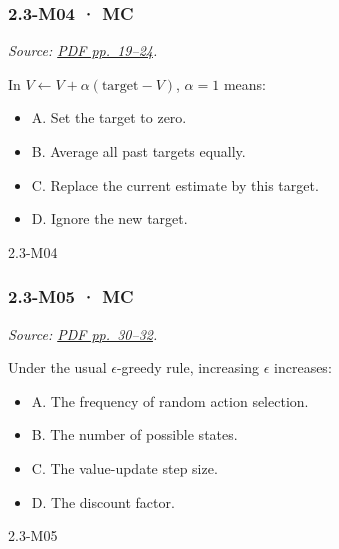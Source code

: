 \noindent\begin{minipage}{\linewidth}

\subsubsection{2.3-M04 · MC}\label{m04-mc-5}

\emph{Source:
\href{../Lecture\%20Slides/2.3.\%20Q-learning.pdf\#page=19}{PDF
pp.~19--24}.}

In \(V\leftarrow V+\alpha(\text{target}-V)\), \(\alpha=1\) means:

\begin{itemize}
\tightlist
\item
  A. Set the target to zero.
\item
  B. Average all past targets equally.
\item
  C. Replace the current estimate by this target.
\item
  D. Ignore the new target.
\end{itemize}

\begin{solution}[8mm]{2.3-M04}

\end{solution}
\end{minipage}\par\medskip

\noindent\begin{minipage}{\linewidth}

\subsubsection{2.3-M05 · MC}\label{m05-mc-5}

\emph{Source:
\href{../Lecture\%20Slides/2.3.\%20Q-learning.pdf\#page=30}{PDF
pp.~30--32}.}

Under the usual \(\epsilon\)-greedy rule, increasing \(\epsilon\)
increases:

\begin{itemize}
\tightlist
\item
  A. The frequency of random action selection.
\item
  B. The number of possible states.
\item
  C. The value-update step size.
\item
  D. The discount factor.
\end{itemize}

\begin{solution}[8mm]{2.3-M05}

\end{solution}
\end{minipage}\par\medskip


